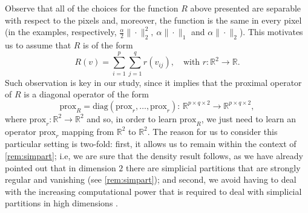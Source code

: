 \documentclass[onefignum,onetabnum]{siamonline250211}
\newcommand{\R}{\mathbb{R}}
\begin{document}
Observe that all of the choices for the function $R$ above presented are separable with respect to the pixels and, moreover, the function is the same in every pixel (in the examples, respectively, $\frac{\alpha}{2}\|\cdot\|_2^2, \ \alpha\|\cdot\|_1$ and $\alpha\|\cdot\|_2$). This motivates us to assume that $R$ is of the form 
\[
R(v)=\sum_{i=1}^{p}\sum_{j=1}^{q}r(v_{ij}), \quad \text{with $r:\mathbb{R}^2\to \mathbb{R}$.}
\] 
Such observation is key in our study, since it implies that the proximal operator of $R$ is a diagonal operator of the form
\begin{equation}\label{eq:separable_prox}
\text{prox}_R = \text{diag}(\text{prox}_r, \dots, \text{prox}_r) : \, \mathbb{R}^{p\times q \times 2} \to \mathbb{R}^{p\times q \times 2},
\end{equation}
where $\text{prox}_r:\R^2 \to \R^2$ and so, in order to learn $\mathrm{prox}_R$, we just need to learn an operator $\mathrm{prox}_r$ mapping from $\R^2$ to $\R^2$. The reason for us to consider this particular setting is two-fold: first, it allows us to remain within the context of \cref{rem:simpart}; i.e, we are sure that the density result follows, as we have already pointed out that in dimension $2$ there are simplicial partitions that are strongly regular and vanishing (see \cref{rem:simpart}); and second, we avoid having to deal with the increasing computational power that is required to deal with simplicial partitions in high dimensions \cite{edelsbrunner1987}.
\end{document}
